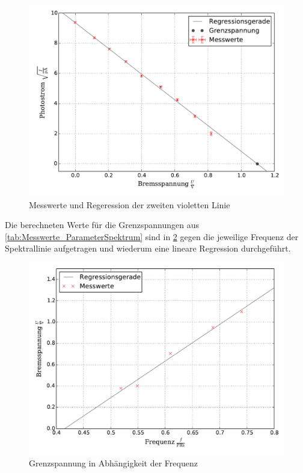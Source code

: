 		\begin{figure}[!h]
			\centering
			\includegraphics[scale=0.7]{Grafiken/Violett2.pdf}
			\caption{Messwerte und Regeression der zweiten violetten Linie \label{fig:Messwerte_Violett2}}
		\end{figure}
		
		Die berechneten Werte für die Grenzspannungen aus \cref{tab:Messwerte_ParameterSpektrum} 
		sind in \cref{fig:Messwerte_Messwert2} gegen die jeweilige Frequenz der Spektrallinie aufgetragen
		und wiederum eine lineare Regression durchgeführt.	
		
		\begin{figure}[!h]
			\centering
			\includegraphics[scale=0.7]{Grafiken/Messreihe2.pdf}
			\caption{Grenzspannung in Abhängigkeit der Frequenz \label{fig:Messwerte_Messwert2}}
		\end{figure}
		
